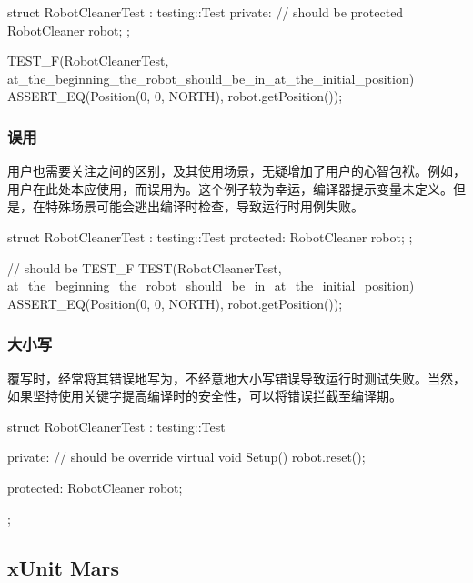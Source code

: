 \begin{content}
\begin{leftbar}
 \begin{c++}
struct RobotCleanerTest : testing::Test {
private:  // should be protected
  RobotCleaner robot;
};
 
TEST_F(RobotCleanerTest, at_the_beginning_the_robot_should_be_in_at_the_initial_position) {
  ASSERT_EQ(Position(0, 0, NORTH), robot.getPosition());
}
  \end{c++}
\end{leftbar}

\subsubsection{误用}

用户也需要关注之间的区别，及其使用场景，无疑增加了用户的心智包袱。例如，用户在此处本应使用，而误用为。这个例子较为幸运，编译器提示变量未定义。但是，在特殊场景可能会逃出编译时检查，导致运行时用例失败。

\begin{leftbar}
 \begin{c++}
struct RobotCleanerTest : testing::Test {
protected:
  RobotCleaner robot;
};

// should be TEST\_F
TEST(RobotCleanerTest, at_the_beginning_the_robot_should_be_in_at_the_initial_position) {
  ASSERT_EQ(Position(0, 0, NORTH), robot.getPosition());
}
  \end{c++}
\end{leftbar}

\subsubsection{大小写}

覆写时，经常将其错误地写为，不经意地大小写错误导致运行时测试失败。当然，如果坚持使用关键字提高编译时的安全性，可以将错误拦截至编译期。

\begin{leftbar}
 \begin{c++}
struct RobotCleanerTest : testing::Test {
private:
  // should be override
  virtual void Setup() {
    robot.reset();
  }
 
protected:
  RobotCleaner robot;
};
  \end{c++}
\end{leftbar}

\subsection{xUnit Mars}


\end{content}
